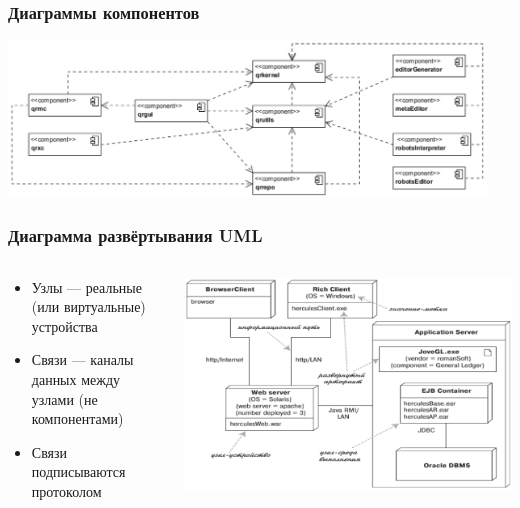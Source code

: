 \documentclass{../../slides-style}
\begin{document}
    \begin{frame}
        \frametitle{Диаграммы компонентов}
        \begin{center}
            \includegraphics[width=0.95\textwidth]{componentDiagrams.png}
        \end{center}
    \end{frame}

    \begin{frame}
        \frametitle{Диаграмма развёртывания UML}
        \begin{columns}
            \begin{column}{0.5\textwidth}
                \begin{itemize}
                    \item Узлы --- реальные (или виртуальные) устройства
                    \item Связи --- каналы данных между узлами (не компонентами)
                    \item Связи подписываются протоколом
                \end{itemize}
            \end{column}
            \begin{column}{0.5\textwidth}
                \begin{center}
                    \includegraphics[width=\textwidth]{deploymentDiagram.png}
                \end{center}
            \end{column}
        \end{columns}
    \end{frame}
\end{document}
